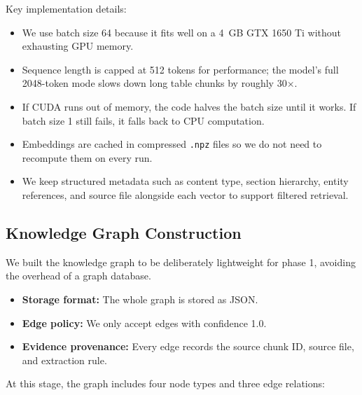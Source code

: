 \documentclass[12pt,a4paper]{report}
\begin{document}
\par
Key implementation details:
\begin{itemize}
  \item We use batch size 64 because it fits well on a 4~GB GTX 1650 Ti without exhausting GPU memory.
  \item Sequence length is capped at 512 tokens for performance; the model's full 2048-token mode slows down long table chunks by roughly 30$\times$.
  \item If CUDA runs out of memory, the code halves the batch size until it works. If batch size 1 still fails, it falls back to CPU computation.
  \item Embeddings are cached in compressed \texttt{.npz} files so we do not need to recompute them on every run.
  \item We keep structured metadata such as content type, section hierarchy, entity references, and source file alongside each vector to support filtered retrieval.
\end{itemize}

\subsection{Knowledge Graph Construction}

We built the knowledge graph to be deliberately lightweight for phase 1, avoiding the overhead of a graph database.

\begin{itemize}
  \item \textbf{Storage format:} The whole graph is stored as JSON.
  \item \textbf{Edge policy:} We only accept edges with confidence 1.0.
  \item \textbf{Evidence provenance:} Every edge records the source chunk ID, source file, and extraction rule.
\end{itemize}

\par
At this stage, the graph includes four node types and three edge relations:
\end{document}
